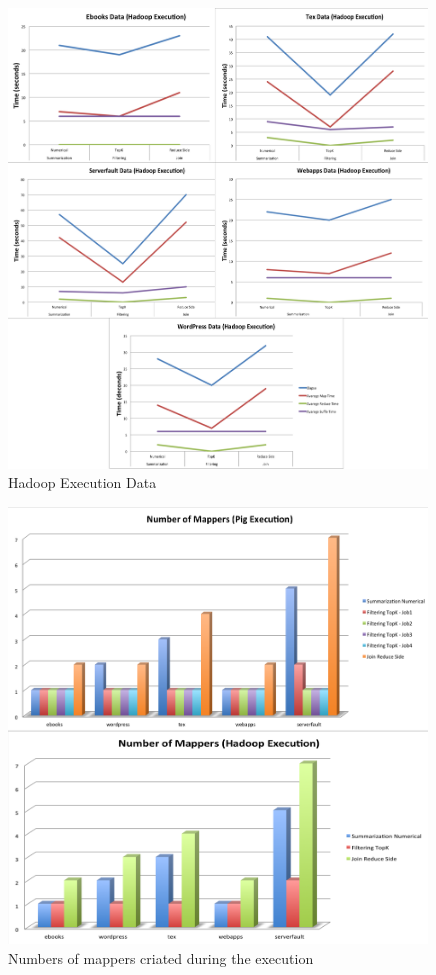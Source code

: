 \begin{figure}[hbtp]
\centering
\includegraphics[width=0.99\textwidth]{figs/analysis-charts/compilation/hadoop.pdf}
\caption{Hadoop Execution Data}
\label{fig:patterns-domain}
\end{figure}

\begin{figure}[hbtp]
\centering
\includegraphics[width=0.99\textwidth]{figs/analysis-charts/compilation/mappers.pdf}
\caption{Numbers of mappers criated during the execution}
\label{fig:patterns-domain}
\end{figure}


